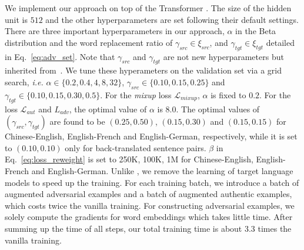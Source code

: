 \documentclass[11pt,a4paper]{article}
\newcommand{\ie}{\emph{i.e. }} \newcommand{\Ie}{\emph{I.e}}
\newcommand{\mixup}{\textit{mixup}\xspace}
\begin{document}
We implement our approach on top of the Transformer \cite{Vaswani:17}. The size of the hidden unit is $512$ and the other hyperparameters are set following their default settings. There are three important hyperparameters in our approach, $\alpha$ in the Beta distribution and the word replacement ratio of $\gamma_{src} \in \xi_{src}$, and $\gamma_{tgt} \in \xi_{tgt}$ detailed in Eq.~\eqref{eq:adv_set}. Note that $\gamma_{src}$ and $\gamma_{tgt}$ are not new hyperparameters but inherited from~\cite{Cheng:19}. We tune these hyperameters on the validation set via a grid search, \ie $\alpha \in \{ 0.2, 0.4, 4, 8, 32\}$, $\gamma_{src} \in \{ 0.10, 0.15, 0.25\}$ and $\gamma_{tgt} \in \{ 0.10, 0.15, 0.30, 0.5\}$. For the \mixup loss $\mathcal{L}_{mixup}$, $\alpha$ is fixed to $0.2$. For the loss $\mathcal{L}_{aut}$ and $L_{adv}$, the optimal value of $\alpha$ is $8.0$. The optimal values of $(\gamma_{src}, \gamma_{tgt})$ are found to be $(0.25, 0.50)$, $(0.15, 0.30)$ and $(0.15, 0.15)$ for Chinese-English, English-French and English-German, respectively, while it is set to $(0.10, 0.10)$ only for back-translated sentence pairs. $\beta$ in Eq.~\eqref{eq:loss_reweight} is set to 250K, 100K, 1M for Chinese-English, English-French and English-German.
Unlike \citet{Cheng:19}, we remove the learning of target language models to speed up the training. For each training batch, we introduce a batch of augmented adversarial examples and a batch of augmented authentic examples, which costs twice the vanilla training. For constructing adversarial examples, we solely compute the gradients for word embeddings which takes little time. After summing up the time of all steps, our total training time is about 3.3 times the vanilla training.
\end{document}
